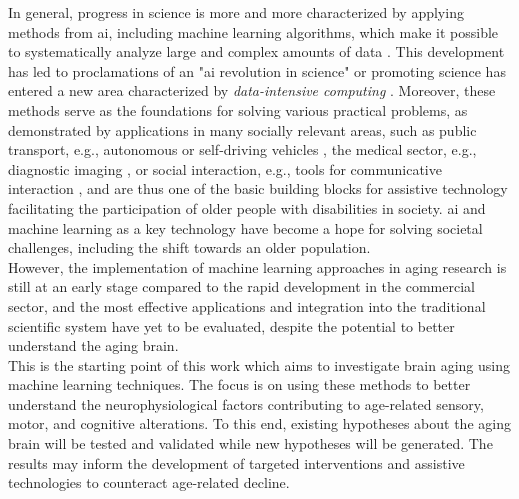 In general, progress in science is more and more characterized by applying methods from \gls{ai}, including machine learning algorithms, which make it possible to systematically analyze large and complex amounts of data \cite{Brunton2019}. This development has led to proclamations of an "\gls{ai} revolution in science" \cite{Appenzeller2017} or promoting science has entered a new area characterized by \textit{data-intensive computing} \cite{Hey2009}. Moreover, these methods serve as the foundations for solving various practical problems, as demonstrated by applications in many socially relevant areas, such as public transport, e.g., autonomous or self-driving vehicles \cite{Leonard2020}, the medical sector, e.g., diagnostic imaging \cite{Liu2020}, or social interaction, e.g., tools for communicative interaction \cite{Adamopoulou2020}, and are thus one of the basic building blocks for assistive technology facilitating the participation of older people with disabilities in society. \Gls{ai} and machine learning as a key technology have become a hope for solving societal challenges, including the shift towards an older population.\\
However, the implementation of machine learning approaches in aging research is still at an early stage compared to the rapid development in the commercial sector, and the most effective applications and integration into the traditional scientific system have yet to be evaluated, despite the potential to better understand the aging brain.\\
This is the starting point of this work which aims to investigate brain aging using machine learning techniques. The focus is on using these methods to better understand the neurophysiological factors contributing to age-related sensory, motor, and cognitive alterations. To this end, existing hypotheses about the aging brain will be tested and validated while new hypotheses will be generated. The results may inform the development of targeted interventions and assistive technologies to counteract age-related decline.

